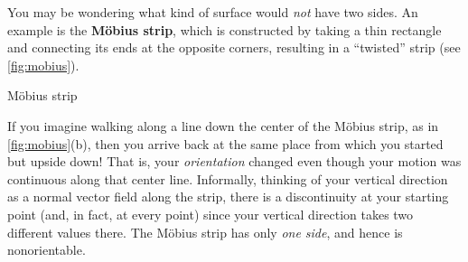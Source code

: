 You may be wondering what kind of surface would \emph{not} have two sides. An example is the \textbf{M\"{o}bius strip}, which is constructed by taking a thin rectangle and connecting its ends at the opposite corners, resulting in a ``twisted'' strip (see \autoref{fig:mobius}).

\begin{lxfigure}
 \caption{M\"{o}bius strip}
 \label{fig:mobius}
\end{lxfigure}

If you imagine walking along a line down the center of the M\"{o}bius strip, as in \autoref{fig:mobius}(b), then you arrive back at the same place from which you started but upside down! That is, your \emph{orientation} changed even though your motion was continuous along that center line. Informally, thinking of your vertical direction as a normal vector field along the strip, there is a discontinuity at your starting point (and, in fact, at every point) since your vertical direction takes two different values there. The M\"{o}bius strip has only \emph{one side}, and hence is nonorientable.%

